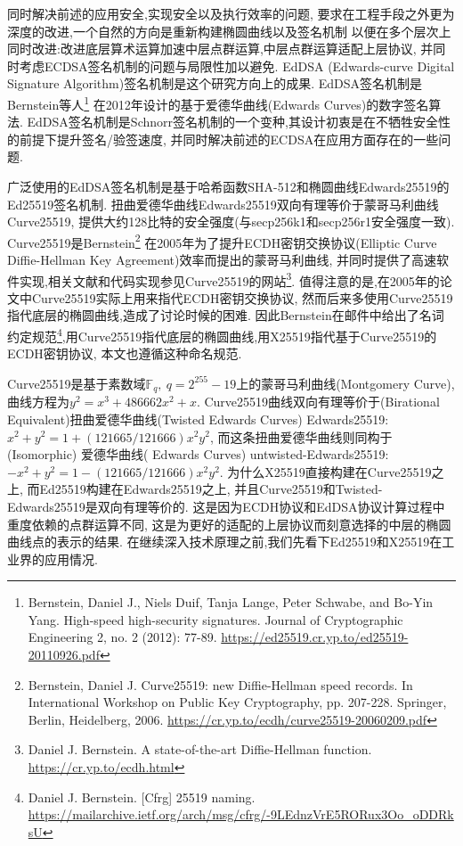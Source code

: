 \documentclass{article}
\newcommand{\F}{\mathbb{F}}
\newcommand{\red}{\textcolor{red}}
\begin{document}
同时解决前述的应用安全,实现安全以及执行效率的问题,
要求在工程手段之外更为深度的改进,一个自然的方向是重新构建椭圆曲线以及签名机制
以便在多个层次上同时改进:改进底层算术运算加速中层点群运算,中层点群运算适配上层协议,
并同时考虑ECDSA签名机制的问题与局限性加以避免.
EdDSA (Edwards-curve Digital Signature Algorithm)签名机制是这个研究方向上的成果.
EdDSA签名机制是Bernstein等人\footnote{
Bernstein, Daniel J., Niels Duif, Tanja Lange, Peter Schwabe, and Bo-Yin Yang. 
High-speed high-security signatures. Journal of Cryptographic Engineering 2, no. 2 (2012): 77-89.
\url{https://ed25519.cr.yp.to/ed25519-20110926.pdf}}
在2012年设计的基于爱德华曲线(Edwards Curves)的数字签名算法.
EdDSA签名机制是Schnorr签名机制的一个变种,其设计初衷是在不牺牲安全性的前提下提升签名/验签速度,
并同时解决前述的ECDSA在应用方面存在的一些问题.

广泛使用的EdDSA签名机制是基于哈希函数SHA-512和椭圆曲线Edwards25519的Ed25519签名机制.
扭曲爱德华曲线Edwards25519双向有理等价于蒙哥马利曲线Curve25519,
提供大约128比特的安全强度(与secp256k1和secp256r1安全强度一致).
Curve25519是Bernstein\footnote{
Bernstein, Daniel J. Curve25519: new Diffie-Hellman speed records.
In International Workshop on Public Key Cryptography, pp. 207-228. Springer, Berlin, Heidelberg, 2006.
\url{https://cr.yp.to/ecdh/curve25519-20060209.pdf}}
在2005年为了提升ECDH密钥交换协议(Elliptic Curve Diffie-Hellman Key Agreement)效率而提出的蒙哥马利曲线,
并同时提供了高速软件实现,相关文献和代码实现参见Curve25519的网站\footnote{
Daniel J. Bernstein. A state-of-the-art Diffie-Hellman function. \url{https://cr.yp.to/ecdh.html}}.
值得注意的是,在2005年的论文中Curve25519实际上用来指代ECDH密钥交换协议,
然而后来多使用Curve25519指代底层的椭圆曲线,造成了讨论时候的困难.
因此Bernstein在邮件中给出了名词约定规范\footnote{
Daniel J. Bernstein. [Cfrg] 25519 naming.
\url{https://mailarchive.ietf.org/arch/msg/cfrg/-9LEdnzVrE5RORux3Oo_oDDRksU}
},用Curve25519指代底层的椭圆曲线,用X25519指代基于Curve25519的ECDH密钥协议,
本文也遵循这种命名规范.

Curve25519是基于素数域$\F_q, \ q = 2^{255}-19$上的蒙哥马利曲线(Montgomery Curve),
曲线方程为$y^2 = x^3 + 486662x^2 + x$.
Curve25519曲线双向有理等价于(Birational Equivalent)扭曲爱德华曲线(Twisted Edwards Curves) Edwards25519:
$x^2 + y^2 = 1 + (121665/121666)x^2y^2$, 而这条扭曲爱德华曲线则同构于(Isomorphic)
爱德华曲线( Edwards Curves) untwisted-Edwards25519: $-x^2+y^2 = 1 - (121665/121666)x^2y^2$.
为什么X25519直接构建在Curve25519之上, 而Ed25519构建在Edwards25519之上,
并且Curve25519和Twisted-Edwards25519是双向有理等价的.
这是因为ECDH协议和EdDSA协议计算过程中重度依赖的点群运算不同,
这是为更好的适配的上层协议而刻意选择的中层的椭圆曲线点的表示的结果.
在继续深入技术原理之前,我们先看下Ed25519和X25519在工业界的应用情况.
\end{document}
